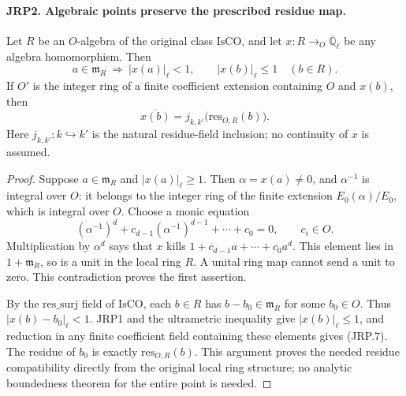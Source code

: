 \paragraph{JRP2. Algebraic points preserve the prescribed residue map.}
\label{claim:JRP2}
Let \(R\) be an \(O\)-algebra of the original class
\(\mathrm{IsCO}\), and let
\(x:R\to_O\overline{\mathbb Q}_\ell\) be any algebra homomorphism.
Then
\[
 a\in\mathfrak m_R\ \Longrightarrow\ |x(a)|_\ell<1,
 \qquad |x(b)|_\ell\le1\quad(b\in R).
 \tag{JRP.6}
\]
If \(O'\) is the integer ring of a finite coefficient extension
containing \(O\) and \(x(b)\), then
\[
 \overline{x(b)}=j_{k,k'}\bigl(\mathrm{res}_{O,R}(b)\bigr).
 \tag{JRP.7}
\]
Here \(j_{k,k'}:k\hookrightarrow k'\) is the natural residue-field
inclusion; no continuity of \(x\) is assumed.
\begin{proof}
Suppose \(a\in\mathfrak m_R\) and \(|x(a)|_\ell\ge1\).
Then \(\alpha=x(a)\ne0\), and \(\alpha^{-1}\) is integral
over \(O\): it belongs to the integer ring of the finite extension
\(E_0(\alpha)/E_0\), which is integral over \(O\).
Choose a monic equation
\[
 (\alpha^{-1})^d+c_{d-1}(\alpha^{-1})^{d-1}
                    +\cdots+c_0=0,\qquad c_i\in O.
\]
Multiplication by \(\alpha^d\) says that \(x\) kills
\(1+c_{d-1}a+\cdots+c_0a^d\).  This element lies in
\(1+\mathfrak m_R\), so is a unit in the local ring \(R\).
A unital ring map cannot send a unit to zero.  This contradiction
proves the first assertion.

By the \(\mathrm{res\_surj}\) field of \(\mathrm{IsCO}\),
each \(b\in R\) has \(b-b_0\in\mathfrak m_R\) for some
\(b_0\in O\).  Thus \(|x(b)-b_0|_\ell<1\).
JRP1 and the ultrametric inequality give \(|x(b)|_\ell\le1\),
and reduction in any finite coefficient field containing these
elements gives (JRP.7).  The residue of \(b_0\) is exactly
\(\mathrm{res}_{O,R}(b)\).  This argument proves the needed
residue compatibility directly from the original local ring
structure; no analytic boundedness theorem for the entire point is
needed.
\end{proof}

